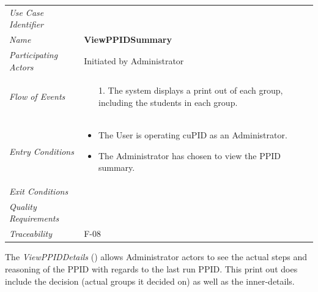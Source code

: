 \documentclass[12pt,letterpaper]{article}
\begin{document}
\begin{center}
	\begin{tabu} to 
		\toprule
		Use Case Identifier & \viewppidsummary{} \\
		Name & {\bf ViewPPIDSummary} \\
		Participating Actors & Initiated by Administrator \\
		Flow of Events & 
		\begin{minipage}[t]{\linewidth}
		    \begin{enumerate}
		        \item[1.] The system displays a print out of each group, including the students in each group.
			\end{enumerate}
	    \end{minipage} \\

		Entry Conditions &
		\begin{minipage}[t]{\linewidth}
			\begin{itemize}
			    \item The User is operating cuPID as an Administrator.
			    \item The Administrator has chosen to view the PPID summary.
	        \end{itemize}
	    \end{minipage} \\

		Exit Conditions & \\

		Quality Requirements & \\

		Traceability & F-08 \\
		\toprule
	\end{tabu}
\end{center}

\vspace{1em}
The {\it ViewPPIDDetails} ({\bf \viewppiddetails{}}) allows Administrator actors to see the actual steps and reasoning of the PPID with regards to the last run PPID. This print out does include the decision (actual groups it decided on) as well
as the inner-details.
\end{document}
